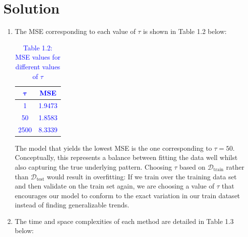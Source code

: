 \documentclass[submit]{../harvardml}
\newenvironment{solution}
  {\color{blue}\section*{Solution}}
{}
\begin{document}
\begin{solution}
\begin{enumerate}
\begin{enumerate}
        \begin{align*}
            \text{MSE}_\text{test}(f_\tau) &= \frac{1}{M} \sum_{m=1}^M \left\{ f_\tau (x_m') - y_m' \right\}^2 \\
            \therefore \quad \Aboxed{ \text{MSE}_\text{test}(f_\tau) &= \frac{1}{M} \sum_{m=1}^M \left\{ \frac{\sum_n K_\tau (x_n, x_m')) y_n}{\sum_n K_\tau (x_n,x_m')}-y_m' \right\}^2 }
        \end{align*}
        \item[(c)] The MSE corresponding to each value of $\tau$ is shown in Table 1.2 below:
        \begin{table}[H]
            \centering
            \renewcommand{\arraystretch}{1.3} %
            \begin{tabular}{|c|c|}
                \hline
                \textcolor{blue}{$\bm{\tau}$} & \textbf{\textcolor{blue}{MSE}} \\
                \hline
                \textcolor{blue}{1}  & \textcolor{blue}{1.9473} \\ 
                \textcolor{blue}{50}  & \textcolor{blue}{1.8583} \\ 
                \textcolor{blue}{2500} & \textcolor{blue}{8.3339} \\ 
                \hline
            \end{tabular}
            \caption*{\textcolor{blue}{Table 1.2: MSE values for different values of $\tau$}}
            \label{tab:mse_tau}
        \end{table}
        The model that yields the lowest MSE is the one corresponding to $\tau=50$. Conceptually, this represents a balance between fitting the data well whilst also capturing the true underlying pattern.
        \newline \newline
        Choosing $\tau$ based on $\mathcal{D}_\text{train}$ rather than $\mathcal{D}_\text{test}$ would result in overfitting: If we train over the training data set and then validate on the train set again, we are choosing a value of $\tau$ that encourages our model to conform to the exact variation in our train dataset instead of finding generalizable trends.
        \item[(d)] The time and space complexities of each method are detailed in Table 1.3 below:
        \begin{table}[H]
            \centering
            \renewcommand{\arraystretch}{1.3} %

\end{table}
\end{enumerate}
\end{enumerate}
\end{solution}
\end{document}
